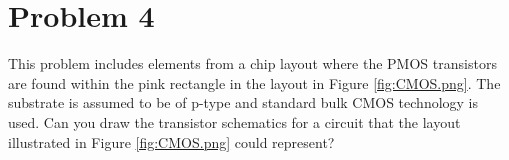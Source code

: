 \section{Problem 4}
This problem includes elements from a chip layout where the PMOS transistors are found within the pink rectangle in the layout in Figure \ref{fig:CMOS.png}. The substrate is assumed to be of p-type and standard bulk CMOS technology is used. Can you draw the transistor schematics for a circuit that the layout illustrated in Figure \ref{fig:CMOS.png} could represent?


